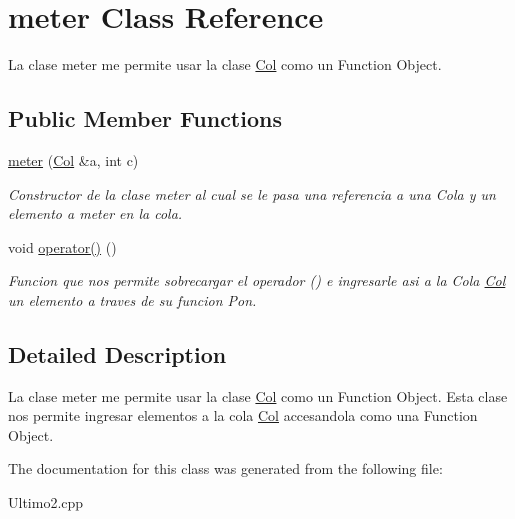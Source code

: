 \hypertarget{classmeter}{
\section{meter Class Reference}
\label{classmeter}
}


La clase meter me permite usar la clase \hyperlink{classCol}{Col} como un Function Object.  


\subsection*{Public Member Functions}
\begin{DoxyCompactItemize}
\item 
\hypertarget{classmeter_a14aaacb5e5f1f0c8e80d01c22c4b1a1b}{
\hyperlink{classmeter_a14aaacb5e5f1f0c8e80d01c22c4b1a1b}{meter} (\hyperlink{classCol}{Col} \&a, int c)}
\label{classmeter_a14aaacb5e5f1f0c8e80d01c22c4b1a1b}

\begin{DoxyCompactList}\small\item\em Constructor de la clase meter al cual se le pasa una referencia a una Cola y un elemento a meter en la cola. \item\end{DoxyCompactList}\item 
\hypertarget{classmeter_aa5c199794a0cfc9e1ca1c7014c283ba6}{
void \hyperlink{classmeter_aa5c199794a0cfc9e1ca1c7014c283ba6}{operator()} ()}
\label{classmeter_aa5c199794a0cfc9e1ca1c7014c283ba6}

\begin{DoxyCompactList}\small\item\em Funcion que nos permite sobrecargar el operador () e ingresarle asi a la Cola \hyperlink{classCol}{Col} un elemento a traves de su funcion Pon. \item\end{DoxyCompactList}\end{DoxyCompactItemize}


\subsection{Detailed Description}
La clase meter me permite usar la clase \hyperlink{classCol}{Col} como un Function Object. Esta clase nos permite ingresar elementos a la cola \hyperlink{classCol}{Col} accesandola como una Function Object. 

The documentation for this class was generated from the following file:\begin{DoxyCompactItemize}
\item 
Ultimo2.cpp\end{DoxyCompactItemize}
